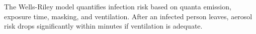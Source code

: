 \documentclass{article}
\newcommand{\D}{\bm{\Delta}}
\begin{document}











The Wells-Riley model quantifies infection risk based on quanta emission, exposure time, masking, and ventilation. After an infected person leaves, aerosol risk drops significantly within minutes if ventilation is adequate.
\end{document}
